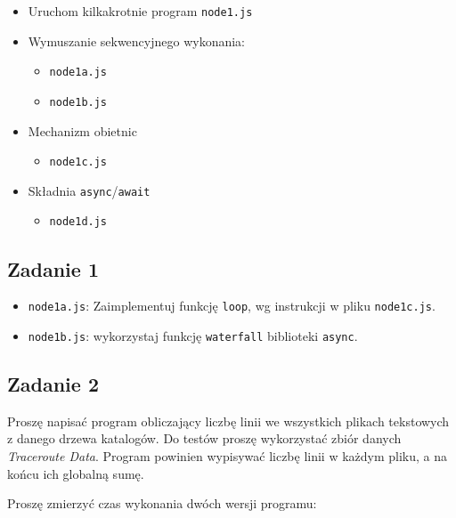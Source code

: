 \documentclass[11pt]{article}
\providecommand{\tightlist}{%
      \setlength{\itemsep}{0pt}\setlength{\parskip}{0pt}}
\begin{document}
\begin{itemize}
\item
  Uruchom kilkakrotnie program \texttt{node1.js}
\item
  Wymuszanie sekwencyjnego wykonania:

  \begin{itemize}
  \tightlist
  \item
    \texttt{node1a.js}
  \item
    \texttt{node1b.js}
  \end{itemize}
\item
  Mechanizm obietnic

  \begin{itemize}
  \tightlist
  \item
    \texttt{node1c.js}
  \end{itemize}
\item
  Składnia \texttt{async}/\texttt{await}

  \begin{itemize}
  \tightlist
  \item
    \texttt{node1d.js}
  \end{itemize}
\end{itemize}

\hypertarget{zadanie-1}{%
\subsection{Zadanie 1}\label{zadanie-1}}

\begin{itemize}
\tightlist
\item
  \texttt{node1a.js}: Zaimplementuj funkcję \texttt{loop}, wg instrukcji
  w pliku \texttt{node1c.js}.
\item
  \texttt{node1b.js}: wykorzystaj funkcję \texttt{waterfall} biblioteki
  \texttt{async}.
\end{itemize}

\hypertarget{zadanie-2}{%
\subsection{Zadanie 2}\label{zadanie-2}}

Proszę napisać program obliczający liczbę linii we wszystkich plikach
tekstowych z danego drzewa katalogów. Do testów proszę wykorzystać zbiór
danych \emph{Traceroute Data}. Program powinien wypisywać liczbę linii w
każdym pliku, a na końcu ich globalną sumę.

Proszę zmierzyć czas wykonania dwóch wersji programu:
\end{document}
